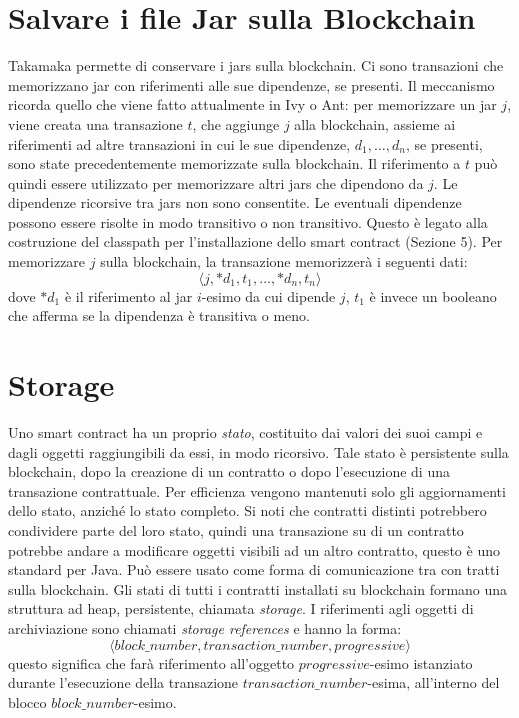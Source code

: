 \section{Salvare i file Jar sulla Blockchain}
Takamaka permette di conservare i jars sulla blockchain. Ci sono transazioni che memorizzano jar con riferimenti alle sue dipendenze, se presenti. Il meccanismo ricorda quello che viene fatto attualmente in Ivy o Ant: per memorizzare un jar $j$, viene creata una transazione $t$, che aggiunge $j$ alla blockchain, assieme ai riferimenti ad altre transazioni in cui le sue dipendenze, $d_1, \dots, d_n$, se presenti, sono state precedentemente memorizzate sulla blockchain. Il riferimento a $t$ può quindi essere utilizzato per memorizzare altri jars che dipendono da $j$. Le dipendenze ricorsive tra jars non sono consentite. Le eventuali dipendenze possono essere risolte in modo transitivo o non transitivo. Questo è legato alla costruzione del classpath per l'installazione dello smart contract (Sezione 5). Per memorizzare $j$ sulla blockchain, la transazione memorizzerà i seguenti dati:
%
\[\langle j, *d_1, t_1, \dots, *d_n, t_n \rangle\]
%
dove $*d_1$ è il riferimento al jar $i$-esimo da cui dipende $j$, $t_1$ è invece un booleano che afferma se la dipendenza è transitiva o meno. 

\section{Storage}
Uno smart contract ha un proprio \textit{stato}, costituito dai valori dei suoi campi e dagli oggetti raggiungibili da essi, in modo ricorsivo. Tale stato è persistente sulla blockchain, dopo la creazione di un contratto o dopo l'esecuzione di una transazione contrattuale. Per efficienza vengono mantenuti solo gli aggiornamenti dello stato, anziché lo stato completo. Si noti che contratti distinti potrebbero condividere parte del loro stato, quindi una transazione su di un contratto potrebbe andare a modificare oggetti visibili ad un altro contratto, questo è uno standard per Java. Può essere usato come forma di comunicazione tra con tratti sulla blockchain. Gli stati di tutti i contratti installati su blockchain formano una struttura ad heap, persistente, chiamata \textit{storage}. I riferimenti agli oggetti di archiviazione sono chiamati \textit{storage references} e hanno la forma:
%
\[\langle block\_number, \mathit{transaction \_number}, \mathit{progressive} \rangle \]
%
questo significa che farà riferimento all'oggetto $progressive$-esimo istanziato durante l'esecuzione della transazione $transaction\_number$-esima, all'interno del blocco $block\_number$-esimo.

